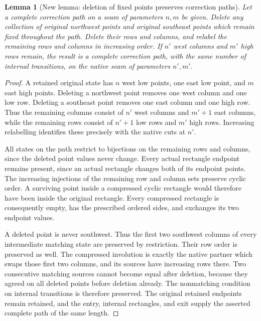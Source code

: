 \documentclass[11pt,oneside]{report}
\newtheorem{lemma}[theorem]{Lemma}
\theoremstyle{definition}
\numberwithin{equation}{section}
\begin{document}
\begin{lemma}[New lemma: deletion of fixed points preserves correction paths]
\label{J05:lem:seam-delete-fixed-points}
Let a complete correction path on a seam of parameters $n,m$ be given.
Delete any collection of original northwest points and original
southeast points which remain fixed throughout the path.
Delete their rows and columns, and relabel the remaining rows and
columns in increasing order.
If $n'$ west columns and $m'$ high rows remain, the result is a
complete correction path, with the same number of internal
transitions, on the native seam of parameters $n',m'$.
\end{lemma}
\begin{proof}
A retained original state has $n$ west low points, one east low point,
and $m$ east high points. Deleting a northwest point removes one west
column and one low row. Deleting a southeast point removes one east
column and one high row. Thus the remaining columns consist of $n'$
west columns and $m'+1$ east columns, while the remaining rows consist
of $n'+1$ low rows and $m'$ high rows. Increasing relabelling identifies
these precisely with the native cuts at $n'$.

All states on the path restrict to bijections on the remaining rows
and columns, since the deleted point values never change.
Every actual rectangle endpoint remains present, since an actual
rectangle changes both of its endpoint points.
The increasing injections of the remaining row and column sets
preserve cyclic order. A surviving point inside a compressed cyclic
rectangle would therefore have been inside the original rectangle.
Every compressed rectangle is consequently empty, has the prescribed
ordered sides, and exchanges its two endpoint values.

A deleted point is never southwest. Thus the first two southwest
columns of every intermediate matching state are preserved by
restriction. Their row order is preserved as well.
The compressed involution is exactly the native partner which swaps
those first two columns, and its sources have increasing rows there.
Two consecutive matching sources cannot become equal after deletion,
because they agreed on all deleted points before deletion already.
The nonmatching condition on internal transitions is therefore
preserved. The original retained endpoints remain retained, and the
entry, internal rectangles, and exit supply the asserted complete
path of the same length.
\end{proof}
\end{document}
